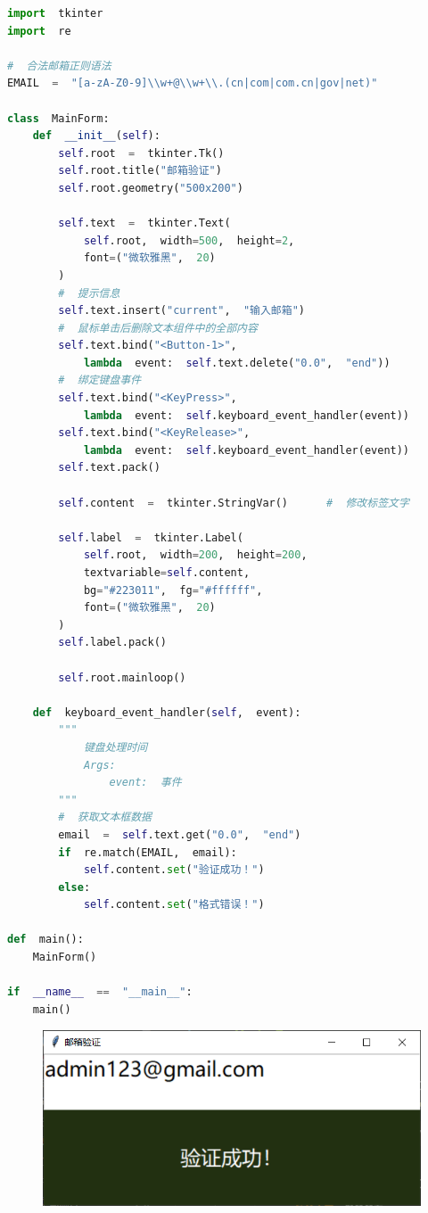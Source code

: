 \begin{lstlisting}[language=Python]
import  tkinter
import  re

#  合法邮箱正则语法
EMAIL  =  "[a-zA-Z0-9]\\w+@\\w+\\.(cn|com|com.cn|gov|net)"

class  MainForm:
    def  __init__(self):
        self.root  =  tkinter.Tk()
        self.root.title("邮箱验证")
        self.root.geometry("500x200")

        self.text  =  tkinter.Text(
            self.root,  width=500,  height=2,
            font=("微软雅黑",  20)
        )
        #  提示信息
        self.text.insert("current",  "输入邮箱")
        #  鼠标单击后删除文本组件中的全部内容
        self.text.bind("<Button-1>",  
            lambda  event:  self.text.delete("0.0",  "end"))
        #  绑定键盘事件
        self.text.bind("<KeyPress>",  
            lambda  event:  self.keyboard_event_handler(event))
        self.text.bind("<KeyRelease>",  
            lambda  event:  self.keyboard_event_handler(event))
        self.text.pack()

        self.content  =  tkinter.StringVar()      #  修改标签文字
        
        self.label  =  tkinter.Label(
            self.root,  width=200,  height=200,
            textvariable=self.content,
            bg="#223011",  fg="#ffffff",
            font=("微软雅黑",  20)
        )
        self.label.pack()

        self.root.mainloop()
    
    def  keyboard_event_handler(self,  event):
        """
            键盘处理时间
            Args:
                event:  事件
        """
        #  获取文本框数据
        email  =  self.text.get("0.0",  "end")
        if  re.match(EMAIL,  email):
            self.content.set("验证成功！")
        else:
            self.content.set("格式错误！")

def  main():
    MainForm()
    
if  __name__  ==  "__main__":
    main()
\end{lstlisting}

\begin{tcolorbox}
	\begin{figure}[H]
		\centering
		\includegraphics[scale=0.8]{img/C13/13-2/1.png}
	\end{figure}
\end{tcolorbox}

